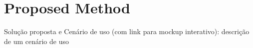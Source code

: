 \section{Proposed Method}

Solução proposta e Cenário de uso (com link para mockup interativo): descrição de um cenário de uso